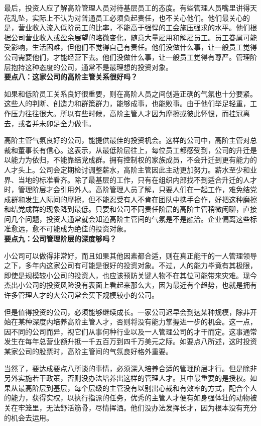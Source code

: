 \documentclass[UTF8,a4paper,zihao=-4,fontset = windows]{ctexart} %
\begin{document}
最后，投资人应了解高阶管理人员对待基层员工的态度。有些管理人员嘴里讲得天花乱坠，实际上不认为对普通员工必须负起责任，也不关心他们。他们最关心的是，营业收入流入低阶员工的比率，不能高于强悍的工会施压强求的水平。他们根据公司营业收入或盈余展望的略微变化，随意大量雇用和解雇员工。员工眷属可能受影响，生活困难，但他们不觉得自己有责任。他们没做什么事，让一般员工觉得公司需要他们，才能经营下去。他们没做什么事，让一般员工觉得有尊严。管理阶层抱持这种态度的公司，通常不是最理想的投资对象。
\\

\textbf{要点八：这家公司的高阶主管关系很好吗？}


如果和低阶员工关系良好很重要，则在高阶人员之间创造正确的气氛也十分要紧。这些人的判断、创造力和群策群力，能够成事，也能败事。由于他们举足轻重，工作压力往往很大。所以有些时候，高阶主管人才因为摩擦或彼此怀恨，而挂冠离去，或者并未卯足全力做事。

高阶主管气氛良好的公司，能提供最佳的投资机会。这样的公司中，高阶主管对总裁和董事长有信心。这表示，从最低阶层往上，每位员工都感受到，公司的升迁是以能力为依归，不能靠结党成群。拥有控制权的家族成员，不会升迁到更有能力的人才头上。公司会定期检讨调整薪水，高阶主管因此主动更加努力。薪水至少和业界、当地的标准看齐。除了最基层的工作，只有在组织内部找不到适合升迁的人才时，管理阶层才会引用外人。高阶管理人员了解，只要人们在一起工作，难免结党成群和发生人际间的摩擦，但不能忍受有人不肯在团队中携手合作，好把这种磨擦和结党成群的现象降到最低。只要和公司不同责任阶层的高阶主管稍微闲聊，直接问几个问题，投资人通常就会知道高阶主管间的气氛是不是融洽。企业偏离这些标准愈远，愈不可能成为绝佳的投资对象。
\\

\textbf{要点九：公司管理阶层的深度够吗？}


小公司可以做得非常好，而且如果其他因素都合适，则在真正能干的一人管理领导之下，多年内这家公司有可能是很好的投资对象。不过，人的能力毕竟有其极限，即使是规模较小公司的投资人，也应该预防关键人物不在其位可能带来灾难。现今杰出小公司的投资风险没有表面上看起来那么大，因为最近有个趋势，也就是拥有许多管理人才的大公司常会买下规模较小的公司。

但是值得投资的公司，必须能够继续成长。一家公司迟早会到达某种规模，除非开始在某种深度内培养高阶主管人才，否则将没有能力掌握进一步的机会。这一点，因不同的公司而异，视它们从事何种行业以及一人管理公司的才干而定。这事通常发生在每年总营业额升抵一千五百万到四千万美元之际。如要点八所述，这时投资某家公司的股票时，高阶主管间的气氛良好格外重要。

当然了，要达成要点八所谈的事情，必须深入培养合适的管理阶层才行。但是除非另外实施若干政策，否则没办法培养出这样的管理人才。其中最重要的是授权。如果从最高阶层到基层，每个层级的主管没有以别出心裁和有效率的方式，配合个人的能力，获得实权，以执行指派的任务，优秀的主管人才便有如身强体壮的动物被关在牢笼里，无法舒活筋骨，尽情挥洒。他们没办法发挥长才，因为根本没有充分的机会去运用。
\end{document}

